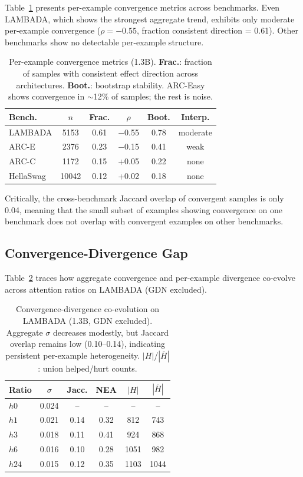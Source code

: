 \documentclass[11pt,a4paper]{article}
\begin{document}
Table~\ref{tab:perexample} presents per-example convergence metrics across benchmarks.
Even LAMBADA, which shows the strongest aggregate trend, exhibits only moderate per-example convergence ($\rho = -0.55$, fraction consistent direction = 0.61).
Other benchmarks show no detectable per-example structure.

\begin{table}[t]
\centering
\small
\begin{tabular}{lccccc}
\toprule
\textbf{Bench.} & $n$ & \textbf{Frac.} & $\rho$ & \textbf{Boot.} & \textbf{Interp.} \\
\midrule
LAMBADA  & 5153 & 0.61 & $-$0.55 & 0.78 & moderate \\
ARC-E    & 2376 & 0.23 & $-$0.15 & 0.41 & weak \\
ARC-C    & 1172 & 0.15 & +0.05  & 0.22 & none \\
HellaSwag & 10042 & 0.12 & +0.02 & 0.18 & none \\
\bottomrule
\end{tabular}
\caption{Per-example convergence metrics (1.3B). \textbf{Frac.}: fraction of samples with consistent effect direction across architectures. \textbf{Boot.}: bootstrap stability. ARC-Easy shows convergence in $\sim$12\% of samples; the rest is noise.}
\label{tab:perexample}
\end{table}

Critically, the cross-benchmark Jaccard overlap of convergent samples is only 0.04, meaning that the small subset of examples showing convergence on one benchmark does not overlap with convergent examples on other benchmarks.

\subsection{Convergence-Divergence Gap}
\label{sec:bridge}

Table~\ref{tab:bridge} traces how aggregate convergence and per-example divergence co-evolve across attention ratios on LAMBADA (GDN excluded).

\begin{table}[t]
\centering
\small
\begin{tabular}{lccccc}
\toprule
\textbf{Ratio} & $\sigma$ & \textbf{Jacc.} & \textbf{NEA} & $|H|$ & $|\overline{H}|$ \\
\midrule
$h0$  & 0.024 & --   & --   & --   & --   \\
$h1$  & 0.021 & 0.14 & 0.32 & 812  & 743  \\
$h3$  & 0.018 & 0.11 & 0.41 & 924  & 868  \\
$h6$  & 0.016 & 0.10 & 0.28 & 1051 & 982  \\
$h24$ & 0.015 & 0.12 & 0.35 & 1103 & 1044 \\
\bottomrule
\end{tabular}
\caption{Convergence-divergence co-evolution on LAMBADA (1.3B, GDN excluded). Aggregate $\sigma$ decreases modestly, but Jaccard overlap remains low (0.10--0.14), indicating persistent per-example heterogeneity. $|H|$/$|\overline{H}|$: union helped/hurt counts.}
\label{tab:bridge}
\end{table}
\end{document}
